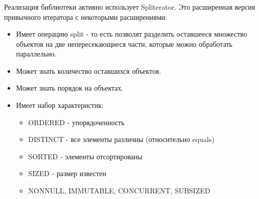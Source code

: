 \begin{frame}
\frametitle{\insertsection} 
\framesubtitle{\insertsubsection}
Реализация библиотеки активно использует Spliterator. Это расширенная версия привычного итератора с некоторыми расширениями:
\begin{itemize}
	\item Имеет операцию split - то есть позволят разделить оставшееся множество объектов на две непересекающиеся части, которые можно обработать параллельно.
	\item Может знать количество оставшихся объектов.
	\item Может знать порядок на объектах.
	\item Имеет набор характеристик:
	\begin{itemize}
		\item ORDERED - упорядоченность
		\item DISTINCT - все элементы различны (относительно equals)
		\item SORTED - элементы отсортированы
		\item SIZED - размер известен
		\item NONNULL, IMMUTABLE, CONCURRENT, SUBSIZED
	\end{itemize}
\end{itemize}
\end{frame}